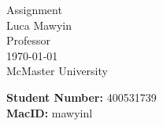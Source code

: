 \documentclass[letterpaper]{article}
\theoremstyle{plain}
\theoremstyle{definition}
\theoremstyle{remark}
\begin{document}

\begin{titlepage}
    \centering
    \vspace*{3cm}
    
    {\Huge Assignment}\\[2cm]
    
    {\large Luca Mawyin}\\[0.5cm]
    
    {\large Professor}\\[0.5cm]

    {\large \today}\\[2cm]

    {\Large McMaster University}

    \vfill
    \begin{flushleft}

        {\large \textbf{Student Number: }400531739}\\[0.5cm]
        {\large \textbf{MacID:} mawyinl}
    \end{flushleft}

\end{titlepage}
\end{document}

